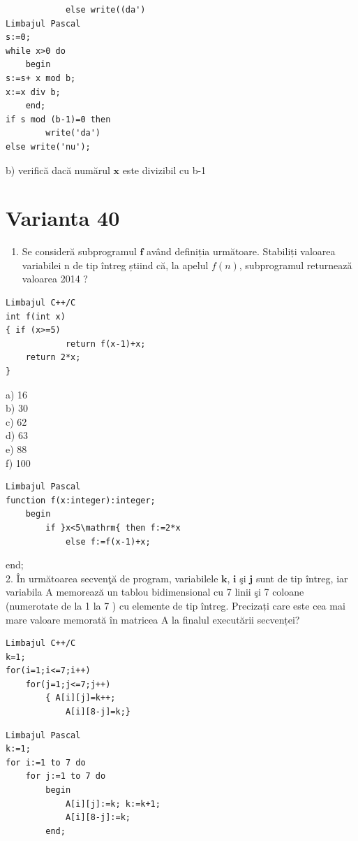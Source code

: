 \documentclass[10pt]{article}
\begin{document}
\begin{verbatim}
            else write((da')
Limbajul Pascal
s:=0;
while x>0 do
    begin
s:=s+ x mod b;
x:=x div b;
    end;
if s mod (b-1)=0 then
        write('da')
else write('nu');
\end{verbatim}

b) verifică dacă numărul $\mathbf{x}$ este divizibil cu b-1

\section*{Varianta 40}
\begin{enumerate}
  \item Se consideră subprogramul $\mathbf{f}$ având definiția următoare. Stabiliți valoarea variabilei n de tip întreg știind că, la apelul $f(n)$, subprogramul returnează valoarea 2014 ?
\end{enumerate}

\begin{verbatim}
Limbajul C++/C
int f(int x)
{ if (x>=5)
            return f(x-1)+x;
    return 2*x;
}
\end{verbatim}

a) 16\\
b) 30\\
c) 62\\
d) 63\\
e) 88\\
f) 100

\begin{verbatim}
Limbajul Pascal
function f(x:integer):integer;
    begin
        if }x<5\mathrm{ then f:=2*x
            else f:=f(x-1)+x;
\end{verbatim}

end;\\
2. În următoarea secvenţă de program, variabilele $\mathbf{k}$, $\mathbf{i}$ şi $\mathbf{j}$ sunt de tip întreg, iar variabila A memorează un tablou bidimensional cu 7 linii şi 7 coloane (numerotate de la 1 la 7 ) cu elemente de tip întreg. Precizați care este cea mai mare valoare memorată în matricea A la finalul executării secvenței?

\begin{verbatim}
Limbajul C++/C
k=1;
for(i=1;i<=7;i++)
    for(j=1;j<=7;j++)
        { A[i][j]=k++;
            A[i][8-j]=k;}
\end{verbatim}

\begin{verbatim}
Limbajul Pascal
k:=1;
for i:=1 to 7 do
    for j:=1 to 7 do
        begin
            A[i][j]:=k; k:=k+1;
            A[i][8-j]:=k;
        end;
\end{verbatim}
\end{document}
